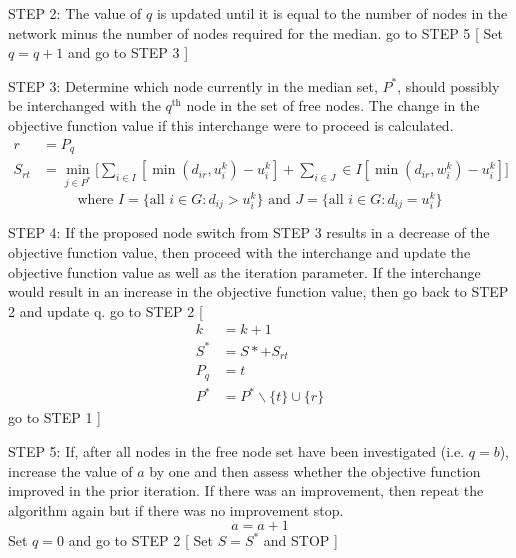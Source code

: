 \documentclass[11pt]{article}
\begin{document}
\begin{algorithm}
\begin{algorithmic}[0]

			
			\Statex 
			\Statex STEP 2: The value of $q$ is updated until it is equal to the number of nodes in the network minus the number of nodes required for the median.
			\Statex go to STEP 5
			[
			\Else
			\Statex Set $q=q+1$ and go to STEP 3
			]
			\EndIf
			
			\Statex 
			\Statex STEP 3: Determine which node currently in the median set, $P^*$, should possibly be interchanged with the $q^{\text{th}}$ node in the set of free nodes.  The change in the objective function value if this interchange were to proceed is calculated.
			\begin{align*}
			r &= P_q\\
			S_{rt} & = \min_{j\in P^*}\big[\sum_{i\in I}[\min(d_{ir},u_i^k)-u_i^k] + \sum_{i\in J}\in I[\min(d_{ir},w_i^k)-u_i^k] \big]
			\end{align*}
			\begin{equation*}
			\text{where } I = \{\text{all } i \in G: d_{ij} > u_i^k\} \text{ and } J = \{\text{all } i \in G: d_{ij} = u_i^k\}
			\end{equation*}
			
			\Statex 
			\Statex STEP 4: If the proposed node switch from STEP 3 results in a decrease of the objective function value, then proceed with the interchange and update the objective function value as well as the  iteration parameter.  If the interchange would result in an increase in the objective function value, then go back to STEP 2 and update q.
			\Statex go to STEP 2
			[
			\begin{align*}
			k &= k+1\\
			S^* &= S* + S_{rt}\\
			P_q &= t\\
			P^* & = P^*\backslash \{t\} \cup \{r\}		
			\end{align*}
			\Statex go to STEP 1				
			]
			\EndIf

\Statex	
{}
\end{algorithmic}
\end{algorithm}

\begin{algorithm}
\begin{algorithmic}[0]
			
			\Statex 
			\Statex STEP 5: If, after all nodes in the free node set have been investigated (i.e. $q=b$), increase the value of $a$ by one and then assess whether the objective function improved in the prior iteration.  If there was an improvement, then repeat the algorithm again but if there was no improvement stop.
			\begin{equation*}
			a = a+1
			\end{equation*}
			\Statex Set $q=0$ and go to STEP 2
			[
			\Statex Set $S=S^*$ and STOP
			]
			\EndIf
			
			
		\end{algorithmic}
	\end{algorithm}
\end{document}
